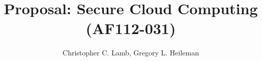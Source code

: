 \documentclass[10pt,draft]{article}
\begin{document}
\title{Proposal: Secure Cloud Computing (AF112-031)}

\author{Christopher C. Lamb, Gregory L. Heileman}

\maketitle







\end{document}
